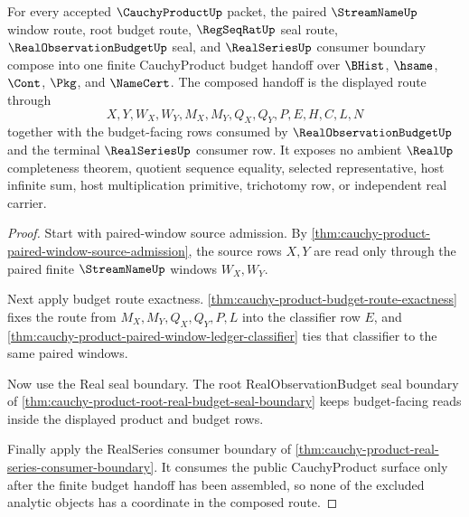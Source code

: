 \begin{theorem}
\label{thm:cauchy-product-finite-budget-composition}
For every accepted $\CauchyProductUp$ packet, the paired $\StreamNameUp$ window route, root budget route, $\RegSeqRatUp$ seal route, $\RealObservationBudgetUp$ seal, and $\RealSeriesUp$ consumer boundary compose into one finite CauchyProduct budget handoff over $\BHist$, $\hsame$, $\Cont$, $\Pkg$, and $\NameCert$. The composed handoff is the displayed route through
$$
X,Y,W_X,W_Y,M_X,M_Y,Q_X,Q_Y,P,E,H,C,L,N
$$
together with the budget-facing rows consumed by $\RealObservationBudgetUp$ and the terminal $\RealSeriesUp$ consumer row. It exposes no ambient $\RealUp$ completeness theorem, quotient sequence equality, selected representative, host infinite sum, host multiplication primitive, trichotomy row, or independent real carrier.
\end{theorem}
\begin{proof}
Start with paired-window source admission. By \autoref{thm:cauchy-product-paired-window-source-admission}, the source rows $X,Y$ are read only through the paired finite $\StreamNameUp$ windows $W_X,W_Y$.

Next apply budget route exactness. \autoref{thm:cauchy-product-budget-route-exactness} fixes the route from $M_X,M_Y,Q_X,Q_Y,P,L$ into the classifier row $E$, and \autoref{thm:cauchy-product-paired-window-ledger-classifier} ties that classifier to the same paired windows.

Now use the Real seal boundary. The root RealObservationBudget seal boundary of \autoref{thm:cauchy-product-root-real-budget-seal-boundary} keeps budget-facing reads inside the displayed product and budget rows.

Finally apply the RealSeries consumer boundary of \autoref{thm:cauchy-product-real-series-consumer-boundary}. It consumes the public CauchyProduct surface only after the finite budget handoff has been assembled, so none of the excluded analytic objects has a coordinate in the composed route.
\end{proof}

